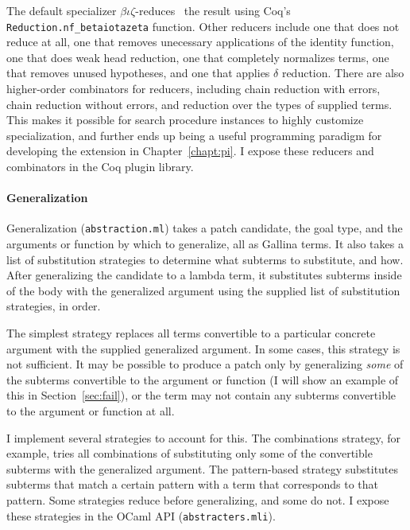 The default specializer $\beta\iota\zeta$-reduces~\cite{equality} the result using Coq's
\lstinline{Reduction.nf_betaiotazeta} function. %
Other reducers include one that does not reduce at all, one that removes unecessary applications of the identity function, 
one that does weak head reduction, one that completely normalizes terms, one that removes unused hypotheses,
and one that applies $\delta$ reduction.
There are also higher-order combinators for reducers,
including chain reduction with errors, chain reduction without errors, and reduction over the types of supplied terms.
This makes it possible for search procedure instances to highly customize specialization,
and further ends up being a useful programming paradigm for developing the \toolnamec extension in Chapter~\ref{chapt:pi}.
I expose these reducers and combinators in the Coq plugin library. %

\paragraph{Generalization} Generalization (\lstinline{abstraction.ml}) %
takes a patch candidate, the goal type, and the arguments or function by which to generalize,
all as Gallina terms.
It also takes a list of substitution strategies to determine what subterms to substitute, and how.
After generalizing the candidate to a lambda term, it substitutes subterms inside of the body with the generalized argument
using the supplied list of substitution strategies, in order.

The simplest strategy replaces all terms convertible to a particular concrete argument %
with the supplied generalized argument.
In some cases, this strategy is not sufficient.
It may be possible to produce a patch only by generalizing \emph{some} of the subterms
convertible to the argument or function (I will show an example of this in Section~\ref{sec:fail}),
or the term may not contain any subterms convertible to the argument or function at all.

I implement several strategies to account for this. The combinations strategy, for example,
tries all combinations of substituting only some of the convertible subterms with the generalized argument. 
The pattern-based strategy substitutes subterms that match a certain pattern
with a term that corresponds to that pattern.
Some strategies reduce before generalizing, and some do not.
I expose these strategies in the \sysname OCaml API (\lstinline{abstracters.mli}). %

